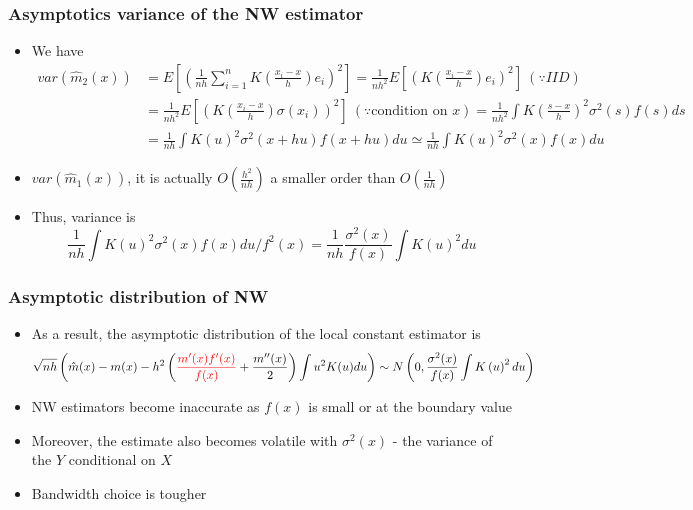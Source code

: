 \documentclass[aspectratio=169]{beamer}
\begin{document}
\begin{frame}
\frametitle{Asymptotics variance of the NW estimator}
 \begin{itemize}

\item  We have
\footnotesize{\[\begin{aligned}
var(\hat{m}_2(x))&=E\left[\left(\frac{1}{nh}\sum_{i=1}^n K\left(\frac{x_i-x}{h}\right)e_i \right)^2\right]=\frac{1}{nh^2}E\left[\left(K\left(\frac{x_i-x}{h}\right)e_i \right)^2\right] \ (\because IID)\\
&=\frac{1}{nh^2}E\left[\left(K\left(\frac{x_i-x}{h}\right)\sigma(x_i) \right)^2\right] \ (\because \text{condition on }x)=\frac{1}{nh^2}\int K\left(\frac{s-x}{h}\right)^2\sigma^2(s)f(s)ds \\
&=\frac{1}{nh}\int K\left(u\right)^2\sigma^2(x+hu)f(x+hu)du \simeq\frac{1}{nh}\int K\left(u\right)^2\sigma^2(x)f(x)du
\end{aligned}\]}\normalsize
\item  $var(\hat{m}_1(x))$, it is actually $O\left(\frac{h^2}{nh}\right)$ a smaller order than $O\left(\frac{1}{nh}\right)$
\item  Thus, variance is
\[
\frac{1}{nh}\int K\left(u\right)^2\sigma^2(x)f(x)du / f^2(x) = \frac{1}{nh}\frac{\sigma^2(x)}{f(x)}\int K\left(u\right)^2du 
\]
 \end{itemize}
\end{frame}

\begin{frame}
\frametitle{Asymptotic distribution of NW}
 \begin{itemize}
\item As a result, the asymptotic distribution of the local constant estimator is
\footnotesize{\[
\sqrt{nh}\left(\hat{m}(x)-m(x)-h^2 \left( \color{red}{\frac{m'(x)f'(x)}{f(x)}} \color{black}+ \frac{m''(x)}{2} \right)\int u^2K(u)du\right)\sim N\left(0, \frac{\sigma^2(x)}{f(x)}\int K\left(u\right)^2du \right)
\]}\normalsize
\item NW estimators become inaccurate as $f(x)$ is small or at the boundary value
\item Moreover, the estimate also becomes volatile with $\sigma^2(x)$ - the variance of the $Y$ conditional on $X$
\item Bandwidth choice is tougher
 \end{itemize}
\end{frame}
\end{document}
